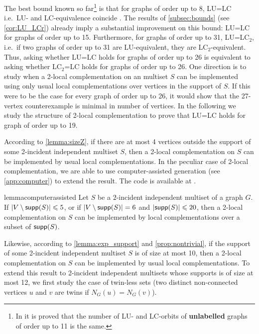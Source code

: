\documentclass[a4paper,UKenglish,cleveref,autoref,thm-restate]{arxiv}
\newcommand{\ls}{\leqslant}
\newcommand{\sm}{\setminus}
\newcommand{\supp}{\textup{\textsf{supp}}}
\begin{document}
The best bound known so far\footnote{In \cite{burchardt2024algorithmverifylocalequivalence} it is proved that the number of LU- and LC-orbits of \textbf{unlabelled} graphs of order up to 11 is the same.} is that for graphs of order up to 8, LU=LC i.e.~LU- and LC-equivalence coincide  \cite{CABELLO20092219}. The results of \cref{subsec:bounds}  (see \cref{cor:LU_LCr}) already imply a substantial improvement on this bound: LU=LC for graphs of order up to 15. Furthermore, for graphs of order up to 31, LU=LC$_2$, i.e.~if two graphs of order up to 31 are LU-equivalent, they are LC$_2$-equivalent. Thus, asking whether LU=LC holds for graphs of order up to 26 is equivalent to asking whether LC$_2$=LC holds for graphs of order up to 26. One direction is to study when a 2-local complementation on an multiset $S$ can be implemented using only usual local complementations over vertices in the support of $S$. If this were to be the case for every graph of order up to 26, it would show that the 27-vertex counterexample is minimal in number of vertices. In the following we study the structure of 2-local complementation to prove that LU=LC holds for graph of order up to 19.

According to \cref{lemma:sizeZ}, if there are at most 4 vertices outside the support of some 2-incident independent multiset $S$, then a 2-local complementation on $S$ can be implemented by usual local complementations. In the peculiar case of 2-local complementation, we are able to use computer-assisted generation (see \cref{app:computer}) to extend the result. The code is available at \cite{codelulc19}.

\begin{restatable}{lemma}{computerassisted} \label{lemma:2lc6}
    Let $S$ be a $2$-incident independent multiset of a graph $G$. If $|V \sm \supp(S)|\ls 5$, or if $|V \sm \supp(S)|= 6$ and $|\supp(S)|\ls 20$, then a 2-local complementation on $S$ can be implemented by local complementations over a subset of $\supp(S)$. 
\end{restatable}


Likewise, according to \cref{lemma:exp_support} and \cref{prop:nontrivial}, if the support of some 2-incident independent multiset $S$ is of size at most 10, then a 2-local complementation on $S$ can be implemented by usual local complementations. To extend this result to 2-incident independent multisets whose supports is of size at most 12, we first study the case of twin-less sets (two distinct non-connected vertices $u$ and $v$ are twins if $N_G(u) = N_G(v)$).
\end{document}
